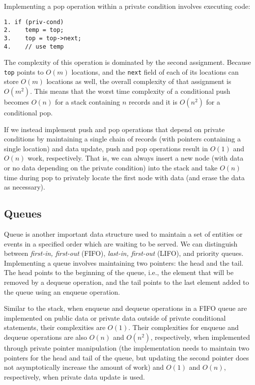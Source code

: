 \documentclass[11pt]{article}
\begin{document}
Implementing a pop operation within a private condition involves executing
code:

{\small \begin{verbatim}
1. if (priv-cond)
2.    temp = top;
3.    top = top->next;
4.    // use temp
\end{verbatim}} 
\noindent The complexity of this operation is dominated by the second
assignment. Because \texttt{top} points to $O(m)$ locations, and the
\texttt{next} field of each of its locations can store $O(m)$ locations as
well, the overall complexity of that assignment is $O(m^2)$. This means that
the worst time complexity of a conditional push becomes $O(n)$ for a stack
containing $n$ records and it is $O(n^2)$ for a conditional pop.

If we instead implement push and pop operations that depend on private
conditions by maintaining a single chain of records (with pointers
containing a single location) and data update, push and pop operations
result in $O(1)$ and $O(n)$ work, respectively. That is, we can always
insert a new node (with data or no data depending on the private condition)
into the stack and take $O(n)$ time during pop to privately locate the first
node with data (and erase the data as necessary).

\subsection{Queues}

Queue is another important data structure used to maintain a set of entities
or events in a specified order which are waiting to be served. We can
distinguish between \textit{first-in, first-out} (FIFO), \textit{last-in,
first-out} (LIFO), and priority queues. Implementing a queue involves
maintaining two pointers: the head and the tail. The head points to the
beginning of the queue, i.e., the element that will be removed by a dequeue
operation, and the tail points to the last element added to the queue using
an enqueue operation. 

Similar to the stack, when enqueue and dequeue operations in a FIFO queue
are implemented on public data or private data outside of private
conditional statements, their complexities are $O(1)$. Their complexities
for enqueue and dequeue operations are also $O(n)$ and $O(n^2)$,
respectively, when implemented through private pointer manipulation (the
implementation needs to maintain two pointers for the head and tail of the
queue, but updating the second pointer does not asymptotically increase the
amount of work) and $O(1)$ and $O(n)$, respectively, when private data
update is used. 
\end{document}

